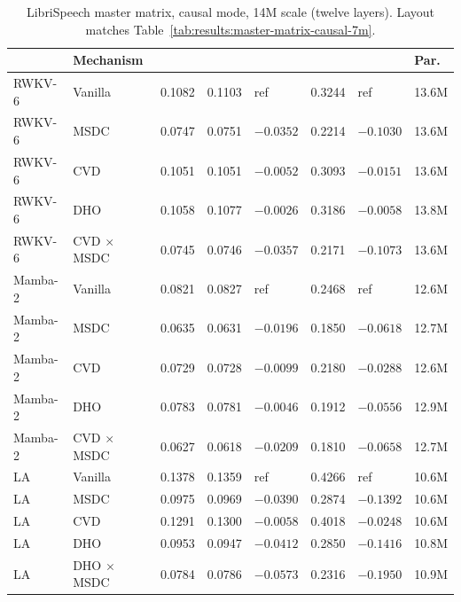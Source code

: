 \begin{table}[p]
\centering
\small
\caption[Master matrix on LibriSpeech, causal, 14M]{LibriSpeech
master matrix, causal mode, 14M scale (twelve layers). Layout
matches Table~\ref{tab:results:master-matrix-causal-7m}.}
\label{tab:results:master-matrix-causal-14m}
\setlength{\tabcolsep}{2pt}
\renewcommand{\arraystretch}{1.15}
\begin{tabularx}{\linewidth}{@{}L{1.89cm} L{2.83cm} N{1.43cm} N{1.43cm} N{1.61cm} N{1.49cm} N{1.61cm} N{0.90cm}@{}}
\toprule
\textbf{} & \textbf{Mechanism} &
\textbf{} & \textbf{} & \textbf{\shortstack[r]{$\Delta$\\CER}} &
\textbf{} & \textbf{\shortstack[r]{$\Delta$\\WER}} & \textbf{Par.} \\
\midrule
RWKV-6   & Vanilla         & 0.1082 & 0.1103 & ref       & 0.3244 & ref       & 13.6M \\
RWKV-6   & MSDC            & 0.0747 & 0.0751 & $-0.0352$ & 0.2214 & $-0.1030$ & 13.6M \\
RWKV-6   & CVD             & 0.1051 & 0.1051 & $-0.0052$ & 0.3093 & $-0.0151$ & 13.6M \\
RWKV-6   & DHO             & 0.1058 & 0.1077 & $-0.0026$ & 0.3186 & $-0.0058$ & 13.8M \\
RWKV-6   & CVD $\times$ MSDC & 0.0745 & 0.0746 & $-0.0357$ & 0.2171 & $-0.1073$ & 13.6M \\
\addlinespace
Mamba-2  & Vanilla         & 0.0821 & 0.0827 & ref       & 0.2468 & ref       & 12.6M \\
Mamba-2  & MSDC            & 0.0635 & 0.0631 & $-0.0196$ & 0.1850 & $-0.0618$ & 12.7M \\
Mamba-2  & CVD             & 0.0729 & 0.0728 & $-0.0099$ & 0.2180 & $-0.0288$ & 12.6M \\
Mamba-2  & DHO             & 0.0783 & 0.0781 & $-0.0046$ & 0.1912 & $-0.0556$ & 12.9M \\
Mamba-2  & CVD $\times$ MSDC & 0.0627 & 0.0618 & $-0.0209$ & 0.1810 & $-0.0658$ & 12.7M \\
\addlinespace
LA       & Vanilla         & 0.1378 & 0.1359 & ref       & 0.4266 & ref       & 10.6M \\
LA       & MSDC            & 0.0975 & 0.0969 & $-0.0390$ & 0.2874 & $-0.1392$ & 10.6M \\
LA       & CVD             & 0.1291 & 0.1300 & $-0.0058$ & 0.4018 & $-0.0248$ & 10.6M \\
LA       & DHO             & 0.0953 & 0.0947 & $-0.0412$ & 0.2850 & $-0.1416$ & 10.8M \\
LA       & DHO $\times$ MSDC & 0.0784 & 0.0786 & $-0.0573$ & 0.2316 & $-0.1950$ & 10.9M \\
\bottomrule
\end{tabularx}
\end{table}

